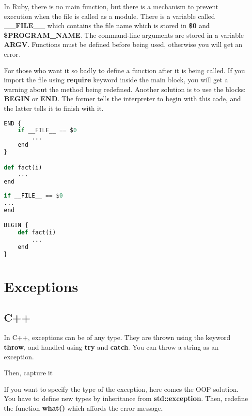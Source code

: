 \documentclass{KodeBook}
\begin{document}
In Ruby, there is no main function, but there is a mechanism to prevent execution when the file is called as a module. 
There is a variable called \textbf{\_\_FILE\_\_} which contains the file name which is stored in \textbf{\$0} and \textbf{\$PROGRAM\_NAME}. 
The command-line arguments are stored in a variable \textbf{ARGV}.
Functions must be defined before being used, otherwise you will get an error.



For those who want it so badly to define a function after it is being called.
If you import the file using \textbf{require} keyword inside the main block, you will get a warning about the method being redefined. 
Another solution is to use the blocks: \textbf{BEGIN} or \textbf{END}. 
The former tells the interpreter to begin with this code, and the latter tells it to finish with it.

\begin{lstlisting}[language=Python, style=codeStyle]
END {
	if __FILE__ == $0
		...
	end
}

def fact(i)
	...
end
\end{lstlisting}

\begin{lstlisting}[language=Python, style=codeStyle]
if __FILE__ == $0
...
end

BEGIN {
	def fact(i)
		...
	end
}
\end{lstlisting}


\section{Exceptions}

\subsection{C++}

In C++, exceptions can be of any type. 
They are thrown using the keyword \textbf{throw}, and handled using \textbf{try} and \textbf{catch}.
You can throw a string as an exception.



Then, capture it




If you want to specify the type of the exception, here comes the OOP solution. 
You have to define new types by inheritance from \textbf{std::exception}. 
Then, redefine the function \textbf{what()} which affords the error message.
\end{document}

